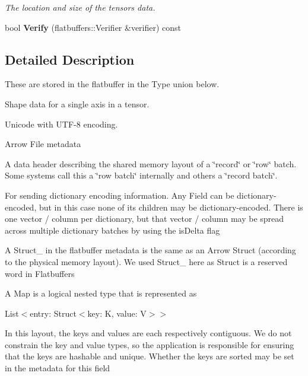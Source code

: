 \begin{DoxyCompactItemize}
\begin{DoxyCompactList}\small\item\em The location and size of the tensor\textquotesingle{}s data. \end{DoxyCompactList}\item 
bool {\bfseries Verify} (flatbuffers\+::\+Verifier \&verifier) const \hypertarget{structorg_1_1apache_1_1arrow_1_1flatbuf_1_1FLATBUFFERS__FINAL__CLASS_af3e217fc40beb9b315e3979010413969}{}\label{structorg_1_1apache_1_1arrow_1_1flatbuf_1_1FLATBUFFERS__FINAL__CLASS_af3e217fc40beb9b315e3979010413969}

\end{DoxyCompactItemize}


\subsection{Detailed Description}
These are stored in the flatbuffer in the Type union below. 

Shape data for a single axis in a tensor.

Unicode with U\+T\+F-\/8 encoding.



 Arrow File metadata

A data header describing the shared memory layout of a \char`\"{}record\char`\"{} or \char`\"{}row\char`\"{} batch. Some systems call this a \char`\"{}row batch\char`\"{} internally and others a \char`\"{}record
batch\char`\"{}.

For sending dictionary encoding information. Any Field can be dictionary-\/encoded, but in this case none of its children may be dictionary-\/encoded. There is one vector / column per dictionary, but that vector / column may be spread across multiple dictionary batches by using the is\+Delta flag

A Struct\+\_\+ in the flatbuffer metadata is the same as an Arrow Struct (according to the physical memory layout). We used Struct\+\_\+ here as Struct is a reserved word in Flatbuffers

A Map is a logical nested type that is represented as

List$<$entry\+: Struct$<$key\+: K, value\+: V$>$$>$

In this layout, the keys and values are each respectively contiguous. We do not constrain the key and value types, so the application is responsible for ensuring that the keys are hashable and unique. Whether the keys are sorted may be set in the metadata for this field

